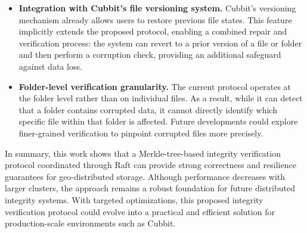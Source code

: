 \begin{itemize}
    \item \textbf{Integration with Cubbit's file versioning system.}
    Cubbit's versioning mechanism already allows users to restore previous file states.
    This feature implicitly extends the proposed protocol, enabling a combined
        repair and verification process: the system can revert to a prior version of a file or folder and then perform a corruption check, providing an additional safeguard against data loss.

    \item \textbf{Folder-level verification granularity.}
    The current protocol operates at the folder level rather than on individual files.
    As a result, while it can detect that a folder contains corrupted data, it cannot directly identify which specific file within that folder is affected.
    Future developments could explore finer-grained verification to pinpoint corrupted files more precisely.
\end{itemize}

In summary, this work shows that a Merkle-tree-based integrity verification
protocol coordinated through Raft can provide strong correctness and resilience guarantees for geo-distributed storage.
Although performance decreases with larger clusters, the approach remains a robust foundation for future distributed integrity systems.
With targeted optimizations, this proposed integrity verification protocol could evolve into a practical and efficient solution for production-scale environments such as Cubbit.

